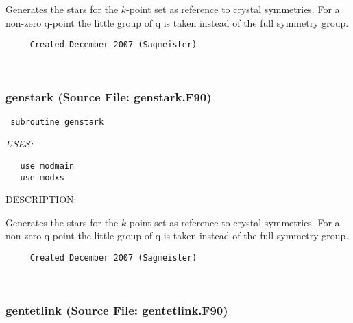 \documentclass[11pt]{article}
\begin{document}
     Generates the stars for the $k$-point set as reference to crystal
     symmetries. For a non-zero q-point the little group of q is taken
     instead of the full symmetry group.
  
\begin{verbatim}     Created December 2007 (Sagmeister)\end{verbatim}


 
 
\mbox{}\hrulefill\ 
 
\subsubsection{genstark (Source File: genstark.F90)}


\begin{verbatim} subroutine genstark\end{verbatim}{\em USES:}
\begin{verbatim}   use modmain
   use modxs\end{verbatim}
{\sf DESCRIPTION:\\ }


     Generates the stars for the $k$-point set as reference to crystal
     symmetries. For a non-zero q-point the little group of q is taken
     instead of the full symmetry group.
  
\begin{verbatim}     Created December 2007 (Sagmeister)\end{verbatim}






 
 
\mbox{}\hrulefill\ 
 
\subsubsection{gentetlink (Source File: gentetlink.F90)}
\end{document}
